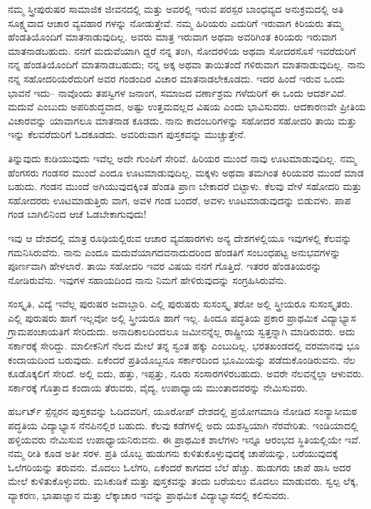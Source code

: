 ನಮ್ಮ ಸ್ತ್ರೀಪುರುಷರ ಸಾಮಾಜಿಕ ಜೀವನದಲ್ಲಿ ಮತ್ತು ಅವರಲ್ಲಿ ಇರುವ ಪರಸ್ಪರ ಬಾಂಧವ್ಯದ ಅನುಕ್ರಮದಲ್ಲಿ ಅತಿ ಸೂಕ್ಷ್ಮವಾದ ಆಚಾರ ವ್ಯವಹಾರ ಗಳನ್ನು ನೋಡುತ್ತೇವೆ. ನಮ್ಮ ಹಿರಿಯರು ಎದುರಿಗೆ ಇರುವಾಗ ಕಿರಿಯರು ತಮ್ಮ ಹೆಂಡತಿಯೊಂದಿಗೆ ಮಾತನಾಡುವುದಿಲ್ಲ. ಅವರು ಮಾತ್ರ ಇರುವಾಗ ಅಥವಾ ಅವರಿಗಿಂತ ಕಿರಿಯರು ಇರುವಾಗ ಮಾತನಾಡಬಹುದು. ನನಗೆ ಮದುವೆಯಾಗಿ ದ್ದರೆ ನನ್ನ ತಂಗಿ, ಸೋದರಳಿಯ ಅಥವಾ ಸೋದರಸೊಸೆ ಇವರೆದುರಿಗೆ ನನ್ನ ಹೆಂಡತಿಯೊಂದಿಗೆ ಮಾತನಾಡಬಹುದು; ನನ್ನ ಅಕ್ಕ ಅಥವಾ ತಾಯಿತಂದೆ ಗಳಿರುವಾಗ ಮಾತನಾಡುವುದಿಲ್ಲ. ನಾನು ನನ್ನ ಸಹೋದರಿಯರೆದುರಿಗೆ ಅವರ ಗಂಡಂದಿರ ವಿಚಾರ ಮಾತನಾಡಲೇಕೂಡದು. ಇದರ ಹಿಂದೆ ಇರುವ ಒಂದು ಭಾವನೆ ಇದು– ನಾವೊಂದು ತಪಸ್ವಿಗಳ ಜನಾಂಗ, ಸಮಾಜದ ವರ್ಣಾಶ್ರಮ ಗಳೆದುರಿಗೆ ಈ ಒಂದು ಆದರ್ಶವಿದೆ. ಮದುವೆ ಎಂಬುದು ಅಪರಿಶುದ್ಧವಾದ, ಅಷ್ಟು ಉತ್ತಮವಲ್ಲದ ವಿಷಯ ಎಂದು ಭಾವಿಸುವರು. ಆದಕಾರಣವೇ ಪ್ರೀತಿಯ ವಿಚಾರವನ್ನು ಯಾವಾಗಲೂ ಮಾತನಾಡ ಕೂಡದು. ನಾನು ಕಾದಂಬರಿಗಳನ್ನು ಸಹೋದರ ಸಹೋದರಿ ತಾಯಿ ಮತ್ತು ಇನ್ನು ಕೆಲವರೆದುರಿಗೆ ಓದಕೂಡದು. ಅವರಿರುವಾಗ ಪುಸ್ತಕವನ್ನು ಮುಚ್ಚುತ್ತೇನೆ.

ತಿನ್ನುವುದು ಕುಡಿಯುವುದು ಇವೆಲ್ಲ ಅದೇ ಗುಂಪಿಗೆ ಸೇರಿವೆ. ಹಿರಿಯರ ಮುಂದೆ ನಾವು ಊಟಮಾಡುವುದಿಲ್ಲ. ನಮ್ಮ ಹೆಂಗಸರು ಗಂಡಸರ ಮುಂದೆ ಎಂದೂ ಊಟಮಾಡುವುದಿಲ್ಲ. ಮಕ್ಕಳು ಅಥವಾ ತಮಗಿಂತ ಕಿರಿಯವರ ಮುಂದೆ ಮಾಡ ಬಹುದು. ಗಂಡನ ಮುಂದೆ ಅಗಿಯುವುದಕ್ಕಿಂತ ಹೆಂಡತಿ ಪ್ರಾಣ ಬೇಕಾದರೆ ಬಿಟ್ಟಾಳು. ಕೆಲವು ವೇಳೆ ಸಹೋದರಿ ಮತ್ತು ಸಹೋದರರು ಊಟಮಾಡುತ್ತಿರು ವಾಗ, ಅವಳ ಗಂಡ ಬಂದರೆ, ಅವಳು ಊಟಮಾಡುವುದನ್ನು ಬಿಡುವಳು. ಪಾಪ ಗಂಡ ಬಾಗಿಲಿನಿಂದ ಆಚೆ ಓಡಬೇಕಾಗುವುದು!

ಇವು ಆ ದೇಶದಲ್ಲಿ ಮಾತ್ರ ರೂಢಿಯಲ್ಲಿರುವ ಆಚಾರ ವ್ಯವಹಾರಗಳು ಅನ್ಯ ದೇಶಗಳಲ್ಲಿಯೂ ಇವುಗಳಲ್ಲಿ ಕೆಲವನ್ನು ಗಮನಿಸಿರುವೆನು. ನಾನು ಎಂದೂ ಮದುವೆಯಾಗದವನಾದುದರಿಂದ ಹೆಂಡತಿಗೆ ಸಂಬಂಧಪಟ್ಟ ಅನುಭವಗಳನ್ನು ಪೂರ್ಣವಾಗಿ ಹೇಳಲಾರೆ. ತಾಯಿ ಸಹೋದರಿ ಇವರ ವಿಷಯ ನನಗೆ ಗೊತ್ತಿದೆ. ಇತರರ ಹೆಂಡತಿಯರನ್ನು ನೋಡಿರುವೆನು. ಇವುಗಳ ಸಹಾಯದಿಂದ ನಾನು ನಿಮಗೆ ಹೇಳಿರುವುದನ್ನು ಸಂಗ್ರಹಿಸಿರುವೆನು.

ಸಂಸ್ಕೃತಿ, ವಿದ್ಯೆ ಇವೆಲ್ಲ ಪುರುಷರ ಜವಾಬ್ದಾರಿ. ಎಲ್ಲಿ ಪುರುಷರು ಸುಸಂಸ್ಕೃ ತರೋ ಅಲ್ಲಿ ಸ್ತ್ರೀಯರೂ ಸುಸಂಸ್ಕೃತರು. ಎಲ್ಲಿ ಪುರುಷರು ಹಾಗೆ ಇಲ್ಲವೋ ಅಲ್ಲಿ ಸ್ತ್ರೀಯರೂ ಹಾಗೆ ಇಲ್ಲ. ಹಿಂದೂ ಪದ್ಧತಿಯ ಪ್ರಕಾರ ಪ್ರಾಥಮಿಕ ವಿದ್ಯಾಭ್ಯಾಸ ಗ್ರಾಮಪಂಚಾಯತಿಗೆ ಸೇರಿದುದು. ಅನಾದಿಕಾಲದಿಂದಲೂ ಜಮೀನನ್ನೆಲ್ಲ ರಾಷ್ಟ್ರೀಯ ಸ್ವತ್ತನ್ನಾಗಿ ಮಾಡಿರುವರು. ಅದು ಸರ್ಕಾರಕ್ಕೆ ಸೇರಿದ್ದು. ಮಾಲೀಕನಿಗೆ ನೆಲದ ಮೇಲೆ ತನ್ನ ಸ್ವಂತ ಹಕ್ಕು ಎಂಬುದಿಲ್ಲ. ಭರತಖಂಡದಲ್ಲಿ ವರಮಾನವು ಭೂ ಕಂದಾಯದಿಂದ ಬರುವುದು. ಏಕೆಂದರೆ ಪ್ರತಿಯೊಬ್ಬನೂ ಸರ್ಕಾರದಿಂದ ಭೂಮಿಯನ್ನು ಪಡೆದುಕೊಂಡಿರುವನು. ನೆಲ ಕೂಡೊಕ್ಕಲಿಗೆ ಸೇರಿದೆ. ಅಲ್ಲಿ ಐದು, ಹತ್ತು, ಇಪ್ಪತ್ತು, ನೂರು ಸಂಸಾರಗಳಿರಬಹುದು. ಅವರೇ ನೆಲವನ್ನೆಲ್ಲಾ ಆಳುವರು. ಸರ್ಕಾರಕ್ಕೆ ಗೊತ್ತಾದ ಕಂದಾಯ ತೆರುವರು, ವೈದ್ಯ, ಉಪಾಧ್ಯಾಯ ಮುಂತಾದವರನ್ನು ನೇಮಿಸುವರು.

ಹರ್ಬರ್ಟ್​ ಸ್ಪೆನ್ಸರನ ಪುಸ್ತಕವನ್ನು ಓದಿದವರಿಗೆ, ಯೂರೋಪ್​ ದೇಶದಲ್ಲಿ ಪ್ರಯೋಗಮಾಡಿ ನೋಡಿದ ಸಂನ್ಯಾಸೀಮಠ ಪದ್ಧತಿಯ ವಿದ್ಯಾಭ್ಯಾಸ ನೆನಪಿನಲ್ಲಿರ ಬಹುದು. ಕೆಲವು ಕಡೆಗಳಲ್ಲಿ ಅದು ಯಶಸ್ವಿಯಾಗಿ ನೆರವೇರಿತು. ಇಂಡಿಯಾದಲ್ಲಿ ಹಳ್ಳಿಯವರು ನೇಮಿಸುವ ಉಪಾಧ್ಯಾಯನಿರುವನು. ಈ ಪ್ರಾಥಮಿಕ ಶಾಲೆಗಳು ಇನ್ನೂ ಆರಂಭದ ಸ್ಥಿತಿಯಲ್ಲಿಯೇ ಇವೆ. ನಮ್ಮ ರೀತಿ ಕೂಡ ಅತೀ ಸರಳ. ಪ್ರತಿ ಯೊಬ್ಬ ಹುಡುಗನು ಕುಳಿತುಕೊಳ್ಳುವುದಕ್ಕೆ ಚಾಪೆಯನ್ನು, ಬರೆಯುವುದಕ್ಕೆ ಓಲೆಗರಿಯನ್ನು ತರುವನು. ಮೊದಲು ಓಲೆಗರಿ, ಏಕೆಂದರೆ ಕಾಗದದ ಬೆಲೆ ಹೆಚ್ಚು. ಹುಡುಗರು ಚಾಪೆ ಹಾಸಿ ಅದರ ಮೇಲೆ ಕುಳಿತುಕೊಳ್ಳುವರು. ಮಸಿಕುಡಿಕೆ ಮತ್ತು ಪುಸ್ತಕವನ್ನು ತಂದು ಬರೆಯಲು ಮೊದಲು ಮಾಡುವರು. ಸ್ವಲ್ಪ ಲೆಕ್ಕ, ವ್ಯಾಕರಣ, ಭಾಷಾಜ್ಞಾನ ಮತ್ತು ಲೆಕ್ಕಾಚಾರ ಇವನ್ನು ಪ್ರಾಥಮಿಕ ವಿದ್ಯಾಭ್ಯಾಸದಲ್ಲಿ ಕಲಿಸುವರು.


